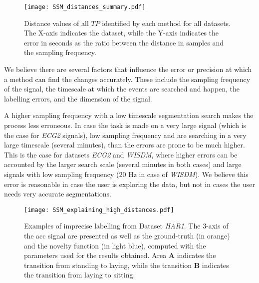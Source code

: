  \begin{figure}
\texttt{[image: SSM\_distances\_summary.pdf]}
\caption{Distance values of all $TP$ identified by each method for all datasets. The X-axis indicates the dataset, while the Y-axis indicates the error in seconds as the ratio between the distance in samples and the sampling frequency.}
\label{fig:error_distribution}
\end{figure}

We believe there are several factors that influence the error or precision at which a method can find the changes accurately. These include the sampling frequency of the signal, the timescale at which the events are searched and happen, the labelling errors, and the dimension of the signal. 

A higher sampling frequency with a low timescale segmentation search makes the process less erroneous. In case the task is made on a very large signal (which is the case for \textit{ECG2} signals), low sampling frequency and are searching in a very large timescale (several minutes), than the errors are prone to be much higher. This is the case for datasets \textit{ECG2} and \textit{WISDM}, where higher errors can be accounted by the larger search scale (several minutes in both cases) and large signals with low sampling frequency (20 Hz in case of \textit{WISDM}). We believe this error is reasonable in case the user is exploring the data, but not in cases the user needs very accurate segmentations. 

 \begin{figure}
\texttt{[image: SSM\_explaining\_high\_distances.pdf]}
\caption{Examples of imprecise labelling from Dataset \textit{HAR1}. The 3-axis of the \gls{acc} signal are presented as well as the ground-truth (in orange) and the novelty function (in light blue), computed with the parameters used for the results obtained. Area \textbf{A} indicates the transition from standing to laying, while the transition \textbf{B} indicates the transition from laying to sitting.}
\label{fig:example_badlabel}
\end{figure}

